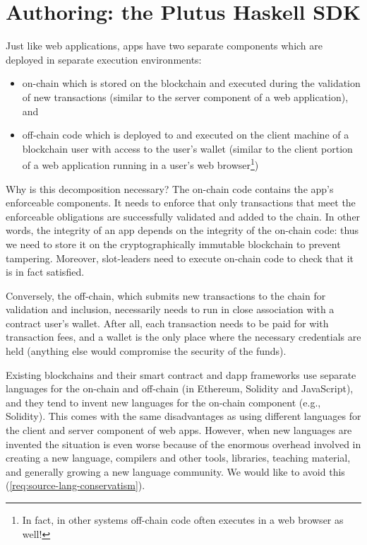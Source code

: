 \section{Authoring: the Plutus Haskell SDK}
\label{sec:sdk}

Just like web applications, \glspl{app} have two separate components which are deployed in separate execution environments:
\begin{itemize}
\item \gls{on-chain} which is stored on the blockchain and executed during the validation of new transactions (similar to the server component of a web application), and
\item \gls{off-chain} code which is deployed to and executed on the client machine of a blockchain user with access to the user’s wallet (similar to the client portion of a web application running in a user’s web browser\footnote{
In fact, in other systems off-chain code often executes in a web browser as well!
})
\end{itemize}

Why is this decomposition necessary? The on-chain code contains the \gls{app}'s enforceable components.
It needs to enforce that only transactions that meet the enforceable obligations are successfully validated and added to the chain.
In other words, the integrity of an \gls{app} depends on the integrity of the on-chain code: thus we need to store it on the cryptographically immutable blockchain to prevent tampering.
Moreover, \glspl{slot-leader} need to execute on-chain code to check that it is in fact satisfied.

Conversely, the \gls{off-chain}, which submits new transactions to the chain for validation and inclusion, necessarily needs to run in close association with a contract user’s wallet.
After all, each transaction needs to be paid for with transaction fees, and a wallet is the only place where the necessary credentials are held (anything else would compromise the security of the funds).

Existing blockchains and their smart contract and dapp frameworks use separate languages for the \gls{on-chain} and \gls{off-chain} (in Ethereum, Solidity and JavaScript), and they tend to invent new languages for the on-chain component (e.g., Solidity).
This comes with the same disadvantages as using different languages for the client and server component of web apps.
However, when new languages are invented the situation is even worse because of the enormous overhead involved in creating a new language, compilers and other tools, libraries, teaching material, and generally growing a new language community. We would like to avoid this (\cref{req:source-lang-conservatism}).

